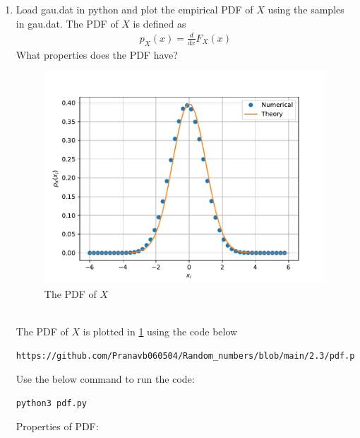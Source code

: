 \documentclass[journal,12pt,twocolumn]{IEEEtran}
\renewcommand\thesection{\arabic{section}}
\begin{document}
\begin{enumerate}[label=\thesection.\arabic*
,ref=\thesection.\theenumi]
\item
Load gau.dat in python and plot the empirical PDF of $X$ using the samples in gau.dat. The PDF of $X$ is defined as
\begin{align}
p_{X}(x) = \frac{d}{dx}F_{X}(x)
\end{align}
What properties does the PDF have?
\\
\begin{figure}[h]
\centering
\includegraphics[width=\columnwidth]{./gauss_pdf}
\caption{The PDF of $X$}
\label{fig:gauss_pdf}
\end{figure}
\\
\solution The PDF of $X$ is plotted in \ref{fig:gauss_pdf} using the code below
\begin{lstlisting}
https://github.com/Pranavb060504/Random_numbers/blob/main/2.3/pdf.py
\end{lstlisting}
Use the below command to run the code:
\begin{lstlisting}
python3 pdf.py
\end{lstlisting}
Properties of PDF:


\end{enumerate}
\end{document}
